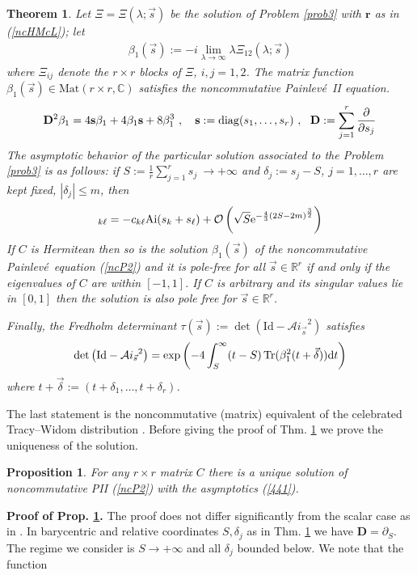 \documentclass{article}
\def\ss{\mathbf s}
\newtheorem{theorem}{Theorem}[section]
\newtheorem{prop}{Proposition}[section]
\def\r{ {\mathbf r}}
\def \C{{\mathbf C}}
\def \D{{\mathbf D}}
\def\b{\beta}
\def\C{{\mathbb C}}
\def\R{{\mathbb R}}
\def\d{{\rm d}}
\def \pa{\partial}
\def\Id{\mathrm{Id}}
\def\Ai{\mathrm{Ai}}
\def\Tr{\mathop{{\rm Tr}}}
\def\Ai{\mathrm{Ai}}
\def\Mat{\mathrm{Mat}}
\newcommand{\be}{\begin{eqnarray}}
\newcommand{\ee}{\end{eqnarray}}
\def\le{\left}
\def\ri{\right}
\begin{document}
\begin{shaded}
\begin{theorem}
\label{thmncHML}
Let $\Xi=\Xi(\lambda;\vec s)$ be the solution of Problem \ref{prob3} with $\r$ as in (\ref{ncHMcL}); let 
\be
\b_1(\vec s ):= -i\lim_{\lambda\to\infty} \lambda \Xi_{12}(\lambda;\vec s)
\ee
where $\Xi_{ij}$ denote the $r\times r$ blocks of $\Xi$, $i,j=1,2$.
The matrix function $\b_1(\vec s)\in \Mat(r\times r,\C)$ satisfies the noncommutative Painlev\'e\ II equation.
\be
\D^2 \b_1 = 4\ss \b_1 +4 \b_1\ss  + 8 \b_1^3\ ,\label{ncP2}\  \ \ 
\ss:= {\rm diag}(s_1,\dots, s_r)\ , \ \ \D:=\sum_{j=1}^r \frac {\pa}{\pa s_j}
\ee
The asymptotic behavior of the particular solution associated to the Problem \ref{prob3} is as follows: 
if $S:=\frac 1 r \sum_{j=1}^r s_j\ \to+\infty$ and $\delta_j:= s_j-S$, $j=1,\dots, r$ are kept fixed, $|\delta_j|\leq m$,   then
\be
 [\b_1]_{k \ell} =  -c_{k\ell} \Ai (s_k+s_\ell) +  \mathcal O\le(\sqrt{S} {\rm e}^{-\frac 4 3(2S-2m)^\frac 32}\ri) \label{441}
 \ee
If $C$ is Hermitean then so is  the solution $\b_1(\vec s)$ of the noncommutative Painlev\'e\ equation (\ref{ncP2})  and it
is pole-free for all $\vec s\in \R^r$  if and only if the eigenvalues of $C$ are within $[-1,1]$. If $C$ is arbitrary and its singular values lie in $[0,1]$ then the solution is also pole free for $\vec s\in \R^r$.

Finally, the Fredholm determinant $\tau(\vec s):= \det \le(\Id - {\mathcal Ai_{\vec s}}^2\ri)$  satisfies 
\be
 \det \le(\Id - {\mathcal Ai_{\vec s}}^2\ri) = \exp\le( - 4 \int_S^\infty (t-S) \Tr (\b_1^2(t+ \vec \delta)) \d t\ri)
 \ee
 where $t+\vec \delta := (t+\delta_1, \dots, t+\delta_r)$.
\end{theorem}
\end{shaded}
The last statement is the noncommutative (matrix) equivalent of the celebrated Tracy--Widom distribution \cite{TracyWidomLevel}.
Before giving the proof of Thm. \ref{thmncHML} we prove the uniqueness of the solution.
\begin{prop}
\label{HMunique}
For any $r\times r$ matrix $C$ there is a unique solution of noncommutative PII (\ref{ncP2}) with the asymptotics (\ref{441}).
\end{prop}
{\bf Proof of Prop. \ref{HMunique}.}
The proof does not differ significantly from the scalar case as in \cite{Hastings-McLeod}. In barycentric and relative coordinates $S, \delta_j$ as in Thm. \ref{thmncHML} we have  $\D = \pa_S$.
The regime we consider is  $S\to+\infty$ and all $\delta_j$ bounded below.
We note that the function 
\end{document}
